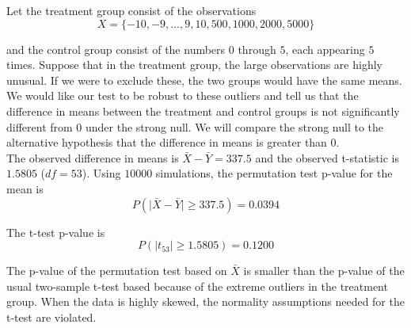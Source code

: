 \documentclass[11pt]{article}
\newcommand{\pr}{P} %
\begin{document}
Let the treatment group consist of the observations
$$ X = \{ -10, -9, \dots, 9, 10, 500, 1000, 2000, 5000\}$$

and the control group consist of the numbers $0$ through $5$, each appearing $5$ times.  Suppose that in the treatment group, the large observations are highly unusual.  If we were to exclude these, the two groups would have the same means.  We would like our test to be robust to these outliers and tell us that the difference in means between the treatment and control groups is not significantly different from $0$ under the strong null.  We will compare the strong null to the alternative hypothesis that the difference in means is greater than $0$.  \\

The observed difference in means is $\bar{X} - \bar{Y} = 337.5$ and the observed t-statistic is $1.5805$ ($df = 53$).  Using $10000$ simulations, the permutation test p-value for the mean is
$$\pr(\lvert \bar{X} - \bar{Y}\rvert \geq 337.5) = 0.0394 $$

The t-test p-value is
$$\pr(\lvert t_{53}\rvert \geq 1.5805) = 0.1200 $$


The p-value of the permutation test based on $\bar{X}$ is smaller than the p-value of the usual two-sample t-test based because of the extreme outliers in the treatment group.  When the data is highly skewed, the normality assumptions needed for the t-test are violated.
\end{document}
